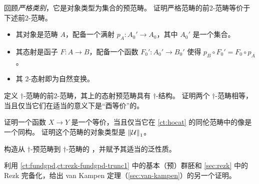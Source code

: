 \begin{ex}\label{ex:2strict-cat}
  回顾\emph{严格类别}，它是对象类型为集合的预范畴。
  证明严格范畴的前2-范畴等价于下述前2-范畴。
  \begin{itemize}
  \item 其对象是范畴 $A$，配备一个满射
    $p_A:A_0'\to A_0$，其中 $A_0'$ 是一个集合。
  \item 其态射是函子 $F:A\to B$，配备一个函数 $F_0':A_0' \to B_0'$ 使得 $p_B \circ F_0' = F_0 \circ p_A$。
  \item 其 2-态射即为自然变换。
  \end{itemize}
\end{ex}

\begin{ex}\label{ex:pre2dagger-cat}
  定义 $\dagger$-范畴的前2-范畴，其上的态射预范畴具有 $\dagger$-结构。
  证明两个 $\dagger$-范畴相等，当且仅当它们在适当的意义下是“酉等价”的。
\end{ex}

\begin{ex}\label{ct:ex:hocat}
  证明一个函数 $X\to Y$ 是一个等价，当且仅当它在 \cref{ct:hocat} 的同伦范畴中的像是一个同构。
  证明这个范畴的对象类型是 $\mathopen{}\left\Vert \mathcal{U}\right\Vert_{1}\mathclose{}$。
\end{ex}

\begin{ex}\label{ex:dagger-rezk}
  构造从 $\dagger$-预范畴到 $\dagger$-范畴的 ，并赋予其适当的泛性质。
\end{ex}

\begin{ex}\label{ex:rezk-vankampen}
  利用 \cref{ct:fundgpd,ct:rezk-fundgpd-trunc1} 中的基本（预）群胚和 \cref{sec:rezk} 中的 Rezk 完备化，给出 van Kampen 定理（\cref{sec:van-kampen}）的另一个证明。
\end{ex}

